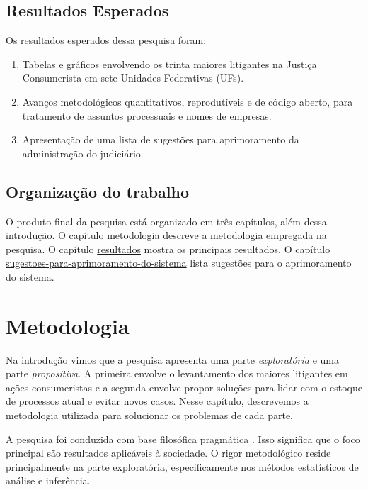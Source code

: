 \documentclass[]{report}
\providecommand{\tightlist}{%
  \setlength{\itemsep}{0pt}\setlength{\parskip}{0pt}}
\begin{document}
\section{Resultados Esperados}\label{resultados-esperados}

Os resultados esperados dessa pesquisa foram:

\begin{enumerate}
\def\labelenumi{\arabic{enumi}.}
\tightlist
\item
  Tabelas e gráficos envolvendo os trinta maiores litigantes na Justiça
  Consumerista em sete Unidades Federativas (UFs).
\item
  Avanços metodológicos quantitativos, reprodutíveis e de código aberto,
  para tratamento de assuntos processuais e nomes de empresas.
\item
  Apresentação de uma lista de sugestões para aprimoramento da
  administração do judiciário.
\end{enumerate}

\section{Organização do trabalho}\label{organizacao-do-trabalho}

O produto final da pesquisa está organizado em três capítulos, além
dessa introdução. O capítulo
\protect\hyperlink{metodologia}{metodologia} descreve a metodologia
empregada na pesquisa. O capítulo
\protect\hyperlink{resultados}{resultados} mostra os principais
resultados. O capítulo
\protect\hyperlink{sugestoes-para-aprimoramento-do-sistema}{sugestoes-para-aprimoramento-do-sistema}
lista sugestões para o aprimoramento do sistema.

\hypertarget{metodologia}{\chapter{Metodologia}\label{metodologia}}

Na introdução vimos que a pesquisa apresenta uma parte
\emph{exploratória} e uma parte \emph{propositiva}. A primeira envolve o
levantamento dos maiores litigantes em ações consumeristas e a segunda
envolve propor soluções para lidar com o estoque de processos atual e
evitar novos casos. Nesse capítulo, descrevemos a metodologia utilizada
para solucionar os problemas de cada parte.

A pesquisa foi conduzida com base filosófica pragmática
\citep{hanson2005mixed}. Isso significa que o foco principal são
resultados aplicáveis à sociedade. O rigor metodológico reside
principalmente na parte exploratória, especificamente nos métodos
estatísticos de análise e inferência.
\end{document}
